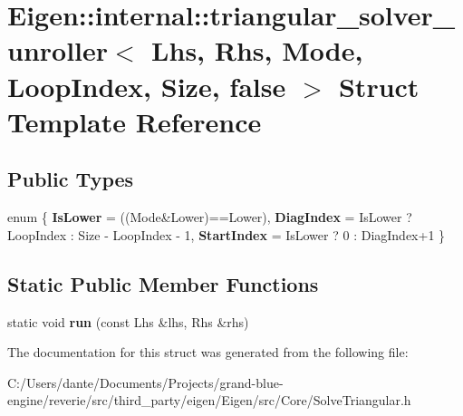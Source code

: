\hypertarget{struct_eigen_1_1internal_1_1triangular__solver__unroller_3_01_lhs_00_01_rhs_00_01_mode_00_01_looefec01585c67928d42a9958d8c8f161e}{}\section{Eigen\+::internal\+::triangular\+\_\+solver\+\_\+unroller$<$ Lhs, Rhs, Mode, Loop\+Index, Size, false $>$ Struct Template Reference}
\label{struct_eigen_1_1internal_1_1triangular__solver__unroller_3_01_lhs_00_01_rhs_00_01_mode_00_01_looefec01585c67928d42a9958d8c8f161e}
\subsection*{Public Types}
\begin{DoxyCompactItemize}
\item 
\mbox{\label{struct_eigen_1_1internal_1_1triangular__solver__unroller_3_01_lhs_00_01_rhs_00_01_mode_00_01_looefec01585c67928d42a9958d8c8f161e_a836c6a462ec4df538f9ec123f18923c9}} 
enum \{ {\bfseries Is\+Lower} = ((Mode\&Lower)==Lower), 
{\bfseries Diag\+Index} = Is\+Lower ? Loop\+Index \+: Size -\/ Loop\+Index -\/ 1, 
{\bfseries Start\+Index} = Is\+Lower ? 0 \+: Diag\+Index+1
 \}
\end{DoxyCompactItemize}
\subsection*{Static Public Member Functions}
\begin{DoxyCompactItemize}
\item 
\mbox{\label{struct_eigen_1_1internal_1_1triangular__solver__unroller_3_01_lhs_00_01_rhs_00_01_mode_00_01_looefec01585c67928d42a9958d8c8f161e_a01b18f6c3a53d6b6f11763d3618b83c0}} 
static void {\bfseries run} (const Lhs \&lhs, Rhs \&rhs)
\end{DoxyCompactItemize}


The documentation for this struct was generated from the following file\+:\begin{DoxyCompactItemize}
\item 
C\+:/\+Users/dante/\+Documents/\+Projects/grand-\/blue-\/engine/reverie/src/third\+\_\+party/eigen/\+Eigen/src/\+Core/Solve\+Triangular.\+h\end{DoxyCompactItemize}

